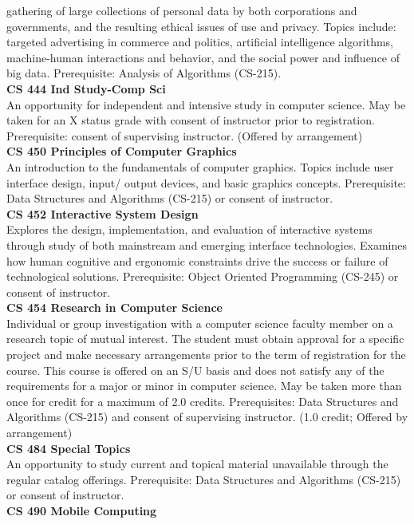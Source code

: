 \documentclass[
  letterpaper,
]{scrbook}
\begin{document}
gathering of large collections of personal data by both corporations and
governments, and the resulting ethical issues of use and privacy. Topics
include: targeted advertising in commerce and politics, artificial
intelligence algorithms, machine-human interactions and behavior, and
the social power and influence of big data. Prerequisite: Analysis of
Algorithms (CS-215).\\
\textbf{CS 444 Ind Study-Comp Sci}\\
An opportunity for independent and intensive study in computer science.
May be taken for an X status grade with consent of instructor prior to
registration. Prerequisite: consent of supervising instructor. (Offered
by arrangement)\\
\textbf{CS 450 Principles of Computer Graphics}\\
An introduction to the fundamentals of computer graphics. Topics include
user interface design, input/ output devices, and basic graphics
concepts. Prerequisite: Data Structures and Algorithms (CS-215) or
consent of instructor.\\
\textbf{CS 452 Interactive System Design}\\
Explores the design, implementation, and evaluation of interactive
systems through study of both mainstream and emerging interface
technologies. Examines how human cognitive and ergonomic constraints
drive the success or failure of technological solutions. Prerequisite:
Object Oriented Programming (CS-245) or consent of instructor.\\
\textbf{CS 454 Research in Computer Science}\\
Individual or group investigation with a computer science faculty member
on a research topic of mutual interest. The student must obtain approval
for a specific project and make necessary arrangements prior to the term
of registration for the course. This course is offered on an S/U basis
and does not satisfy any of the requirements for a major or minor in
computer science. May be taken more than once for credit for a maximum
of 2.0 credits. Prerequisites: Data Structures and Algorithms (CS-215)
and consent of supervising instructor. (1.0 credit; Offered by
arrangement)\\
\textbf{CS 484 Special Topics}\\
An opportunity to study current and topical material unavailable through
the regular catalog offerings. Prerequisite: Data Structures and
Algorithms (CS-215) or consent of instructor.\\
\textbf{CS 490 Mobile Computing}\\
\end{document}
